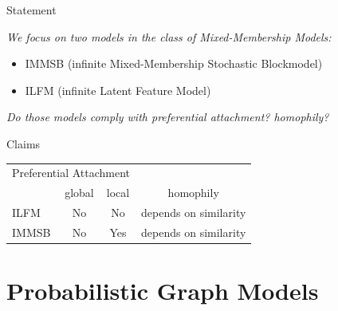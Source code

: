 %
%
%
%

\begin{frame}[t]{Statement}
    \vspace{3em}

    \textit{\Large{We focus on two models in the class of Mixed-Membership Models: }}
    \begin{itemize}
        \item IMMSB (infinite Mixed-Membership Stochastic Blockmodel)
        \item ILFM (infinite Latent Feature Model) 
    \end{itemize}

    \vspace{2em}

    \textit{\Large{Do those models comply with preferential attachment? homophily?  }}


\pause

\begin{block}{Claims}
\begin{tabular}{l|cc|c}

    \multicolumn{3}{c}{\hspace{1.3cm}Preferential Attachment}   \\
    \cmidrule(l){2-3} 
    &   global & local  &   homophily      \\
    \hline
    ILFM       & \cellcolor{red!25}No & \cellcolor{red!25}No   & depends on similarity  \\
    IMMSB       & \cellcolor{red!25}No & \cellcolor{green!25}Yes  & depends on similarity \\
\end{tabular}
\end{block}

\end{frame}

\section{Probabilistic Graph Models}

%
%

